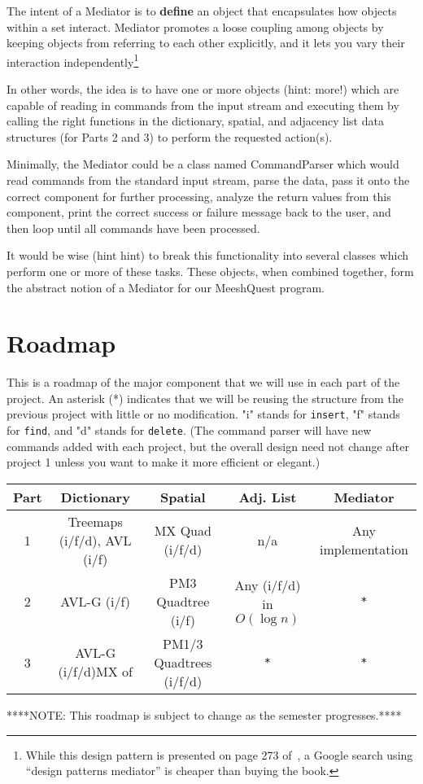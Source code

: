 \documentclass[12pt]{article}
\begin{document}
The intent of a Mediator is to \textbf{define} an object that encapsulates
how objects within a set interact. Mediator promotes a loose coupling among objects
by keeping objects from referring to each other explicitly, and it lets you 
vary their interaction independently\footnote{While this design pattern is 
presented on page 273 of~\cite{designp}, a Google search using ``design 
patterns mediator'' is cheaper than buying the book.}

In other words, the idea is to have one or more objects (hint: more!) which
are capable of reading in commands from the input stream and executing them
by calling the right functions in the dictionary, spatial, and adjacency
list data structures (for Parts 2 and 3) to perform the requested action(s).

Minimally, the Mediator could be a class named CommandParser which would
read commands from the standard input stream, parse the data, pass it onto
the correct component for further processing, analyze the return values
from this component, print the correct success or failure message back to
the user, and then loop until all commands have been processed.

It would be wise (hint hint) to break this functionality into several
classes which perform one or more of these tasks. These objects, when
combined together, form the abstract notion of a Mediator for our
MeeshQuest program.


\section{Roadmap}


This is a roadmap of the major component that we will use in each part of the project. 
An asterisk (*) indicates that we will be reusing the structure from 
the previous project with little or no modification. "i" stands for \texttt{insert}, "f" stands
for {\tt find}, and "d" stands for {\tt delete}. (The command parser will have 
new commands added with each project, but the overall design need not 
change after project 1 unless you want to make it more efficient or elegant.) \\

\begin{tabular}{|c|c|c|c|c|} \hline
Part&Dictionary&Spatial&Adj. List&Mediator \\ \hline
1&Treemaps (i/f/d), AVL (i/f)&MX Quad (i/f/d)&n/a&Any implementation \\ \hline
2&AVL-G (i/f)&PM3 Quadtree (i/f)&Any (i/f/d) in $O(\log n)$&\verb|*| \\ \hline
3&AVL-G (i/f/d)MX of &PM1/3   Quadtrees (i/f/d)&\verb|*|&\verb|*| \\ \hline
\end{tabular}
\begin{center}
****NOTE: This roadmap is subject to change as the semester progresses.****
\end{center}
\end{document}
